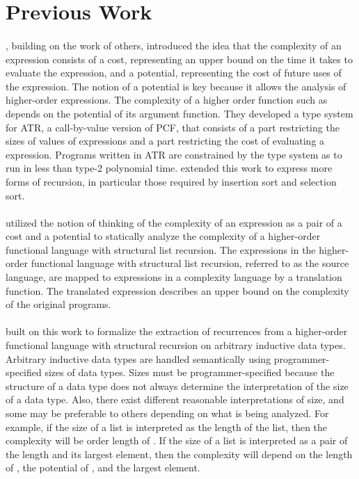 \section{Previous Work} \paragraph{}
\citet{Danner2007}, building on the work of others, introduced the idea that the complexity of an expression consists of a cost, representing an upper bound on the time it takes to evaluate the expression, and a potential, representing the cost of future uses of the expression.
The notion of a potential is key because it allows the analysis of higher-order expressions. 
The complexity of a higher order function such as  depends on the potential of its argument function.
They developed a type system for ATR, a call-by-value version of PCF, that consists of a part restricting the sizes of values of expressions and a part restricting the cost of evaluating a expression.
Programs written in ATR are constrained by the type system as to run in less than type-2 polynomial time.
\citet{Danner2009} extended this work to express more forms of recursion, in particular those required by insertion sort and selection sort.

\paragraph{}
\citet{Danner2013} utilized the notion of thinking of the complexity of an expression as a pair of a cost and a potential to statically analyze the complexity of a higher-order functional language with structural list recursion.
The expressions in the higher-order functional language with structural list recursion, referred to as the source language, are mapped to expressions in a complexity language by a translation function.
The translated expression describes an upper bound on the complexity of the original programs.

\paragraph{}
\citet{Danner2015} built on this work to formalize the extraction of recurrences from a higher-order functional language with structural recursion on arbitrary inductive data types.
Arbitrary inductive data types are handled semantically using programmer-specified sizes of data types.
Sizes must be programmer-specified because the structure of a data type does not always determine the interpretation of the size of a data type.
Also, there exist different reasonable interpretations of size, and some may be preferable to others depending on what is being analyzed.
For example, if the size of a list is interpreted as the length of the list, then the complexity  will be order length of .
If the size of a list is interpreted as a pair of the length and its largest element, then the complexity will depend on the length of , the potential of , and the largest element.


